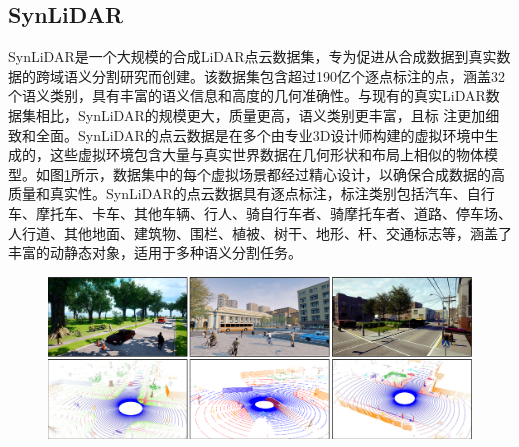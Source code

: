 \subsection{SynLiDAR}
SynLiDAR是一个大规模的合成LiDAR点云数据集，专为促进从合成数据到真实数据的跨域语义分割研究而创建。该数据集包含超过190亿个逐点标注的点，涵盖32个语义类别，具有丰富的语义信息和高度的几何准确性。与现有的真实LiDAR数据集相比，SynLiDAR的规模更大，质量更高，语义类别更丰富，且标
注更加细致和全面。SynLiDAR的点云数据是在多个由专业3D设计师构建的虚拟环境中生成的，这些虚拟环境包含大量与真实世界数据在几何形状和布局上相似的物体模型。如图\ref{fig:2-4}所示，数据集中的每个虚拟场景都经过精心设计，以确保合成数据的高质量和真实性。SynLiDAR的点云数据具有逐点标注，标注类别包括汽车、自行车、摩托车、卡车、其他车辆、行人、骑自行车者、骑摩托车者、道路、停车场、人行道、其他地面、建筑物、围栏、植被、树干、地形、杆、交通标志等，涵盖了丰富的动静态对象，适用于多种语义分割任务。
\vspace{-0.1cm}
\begin{figure}[h]
    \centering
    \includegraphics[width = \textwidth, scale=0.5]{ljx/figure/2-5/synlidar.png}
    \label{fig:2-4}
\end{figure}
\vspace{-0.35cm} 
